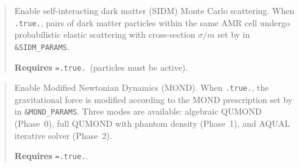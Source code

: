 \label{param:sidm}

\begin{quote}
Enable self-interacting dark matter (SIDM) Monte Carlo scattering.
When \texttt{.true.}, pairs of dark matter particles within the same
AMR cell undergo probabilistic elastic scattering with cross-section
$\sigma/m$ set by  in
\texttt{\&SIDM\_PARAMS}.

\textbf{Requires} \texttt{=.true.}\ (particles must be
active).

\end{quote}

\label{param:use_mond}

\begin{quote}
Enable Modified Newtonian Dynamics (MOND).  When \texttt{.true.}, the
gravitational force is modified according to the MOND prescription set
by  in \texttt{\&MOND\_PARAMS}.  Three modes are
available: algebraic QUMOND (Phase~0), full QUMOND with phantom density
(Phase~1), and AQUAL iterative solver (Phase~2).

\textbf{Requires} \texttt{=.true.}.

\end{quote}

\label{param:exchange_method}

